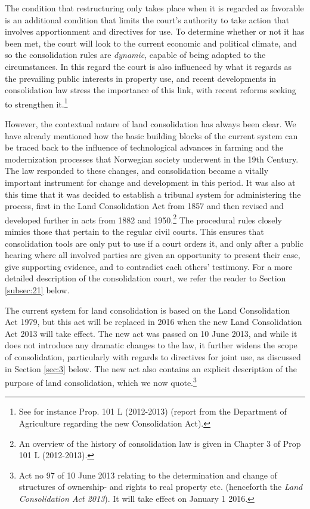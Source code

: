 The condition that restructuring only takes place when it is regarded as favorable is an additional condition that limits the court's authority to take action that involves apportionment and directives for use. To determine whether or not it has been met, the court will look to the current economic and political climate, and so the consolidation rules are \emph{dynamic}, capable of being adapted to the circumstances. In this regard the court is also influenced by what it regards as the prevailing public interests in property use, and recent developments in consolidation law stress the importance of this link, with recent reforms seeking to strengthen it.\footnote{See for instance Prop. 101 L (2012-2013) (report from the Department of Agriculture regarding the new Consolidation Act).}

However, the contextual nature of land consolidation has always been clear. We have already mentioned how the basic building blocks of the current system can be traced back to the influence of technological advances in farming and the modernization processes that Norwegian society underwent in the 19th Century. The law responded to these changes, and consolidation became a vitally important instrument for change and development in this period. It was also at this time that it was decided to establish a tribunal system for administering the process, first in the Land Consolidation Act from 1857 and then revised and developed further in acts from 1882 and 1950.\footnote{An overview of the history of consolidation law is given in Chapter 3 of Prop 101 L (2012-2013).} The procedural rules closely mimics those that pertain to the regular civil courts. This ensures that consolidation tools are only put to use if a court orders it, and only after a public hearing where all involved parties are given an opportunity to present their case, give supporting evidence, and to contradict each others' testimony. For a more detailed description of the consolidation court, we refer the reader to Section \ref{subsec:21} below.

The current system for land consolidation is based on the Land Consolidation Act 1979, but this act will be replaced in 2016 when the new Land Consolidation Act 2013 will take effect. The new act was passed on 10 June 2013, and while it does not introduce any dramatic changes to the law, it further widens the scope of consolidation, particularly with regards to directives for joint use, as discussed in Section \ref{sec:3} below. The new act also contains an explicit description of the purpose of land consolidation, which we now quote.\footnote{Act no 97 of 10 June 2013 relating to the determination and change of structures of ownership- and rights to real property etc. (henceforth the \emph{Land Consolidation Act 2013}). It will take effect on January 1 2016.}

